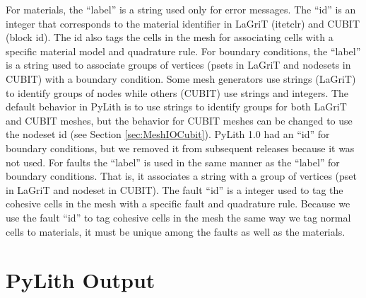 For materials, the ``label'' is a string used only for error messages.
The ``id'' is an integer that corresponds to the material identifier
in LaGriT (itetclr) and CUBIT (block id). The id also tags the cells
in the mesh for associating cells with a specific material model and
quadrature rule. For boundary conditions, the ``label'' is a string
used to associate groups of vertices (psets in LaGriT and nodesets
in CUBIT) with a boundary condition. Some mesh generators use strings
(LaGriT) to identify groups of nodes while others (CUBIT) use strings
and integers. The default behavior in PyLith is to use strings to
identify groups for both LaGriT and CUBIT meshes, but the behavior
for CUBIT meshes can be changed to use the nodeset id (see Section
\ref{sec:MeshIOCubit}). PyLith 1.0 had an ``id'' for boundary conditions,
but we removed it from subsequent releases because it was not used.
For faults the ``label'' is used in the same manner as the ``label''
for boundary conditions. That is, it associates a string with a group
of vertices (pset in LaGriT and nodeset in CUBIT). The fault ``id''
is a integer used to tag the cohesive cells in the mesh with a specific
fault and quadrature rule. Because we use the fault ``id'' to tag
cohesive cells in the mesh the same way we tag normal cells to materials,
it must be unique among the faults as well as the materials.


\section{PyLith Output}

